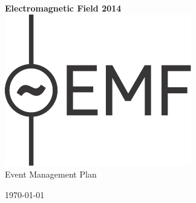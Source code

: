 

\newcommand{\st}{\superscript{st} }
\newcommand{\nd}{\superscript{nd} }
\renewcommand{\th}{\superscript{th} }



\begin{titlepage}
\begin{center}
{\bf \LARGE Electromagnetic Field 2014}\\[36pt]
\includegraphics{emf-logo.pdf}\\[48pt]
{\Large Event Management Plan}

\vfill
\today

\end{center}
\end{titlepage}

\tableofcontents

\newpage



